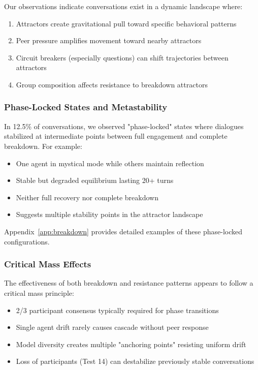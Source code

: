 \documentclass[11pt,letterpaper]{article}
\newcommand{\exponedataPhaseLockedPercentage}{12.5\%}
\begin{document}
Our observations indicate conversations exist in a dynamic landscape where:

\begin{enumerate}
    \item Attractors create gravitational pull toward specific behavioral patterns
    \item Peer pressure amplifies movement toward nearby attractors
    \item Circuit breakers (especially questions) can shift trajectories between attractors
    \item Group composition affects resistance to breakdown attractors
\end{enumerate}

\subsubsection{Phase-Locked States and Metastability}

In \exponedataPhaseLockedPercentage{} of conversations, we observed "phase-locked" states where dialogues stabilized at intermediate points between full engagement and complete breakdown. For example:
\begin{itemize}
    \item One agent in mystical mode while others maintain reflection
    \item Stable but degraded equilibrium lasting 20+ turns
    \item Neither full recovery nor complete breakdown
    \item Suggests multiple stability points in the attractor landscape
\end{itemize}
Appendix~\ref{app:breakdown} provides detailed examples of these phase-locked configurations.

\subsubsection{Critical Mass Effects}

The effectiveness of both breakdown and resistance patterns appears to follow a critical mass principle:
\begin{itemize}
    \item 2/3 participant consensus typically required for phase transitions
    \item Single agent drift rarely causes cascade without peer response
    \item Model diversity creates multiple "anchoring points" resisting uniform drift
    \item Loss of participants (Test 14) can destabilize previously stable conversations
\end{itemize}
\end{document}
